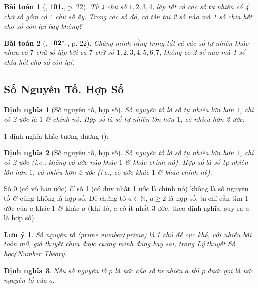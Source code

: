\documentclass{article}
\numberwithin{equation}{section}
\newtheorem{dinhnghia}{Định nghĩa}[section]
\newtheorem{baitoan}{Bài toán}[section]
\newtheorem{luuy}{Lưu ý}[section]
\begin{document}
\begin{baitoan}[\cite{Binh_Toan_6_tap_1}, \textbf{101.}, p. 22]
	Từ 4 chữ số $1,2,3,4$, lập tất cả các số tự nhiên có 4 chữ số gồm cả $4$ chữ số ấy. Trong các số đó, có tồn tại 2 số nào mà 1 số chia hết cho số còn lại hay không?
\end{baitoan}

\begin{baitoan}[\cite{Binh_Toan_6_tap_1}, $\bf 102^\star.$, p. 22]
	Chứng minh rằng trong tất cả các số tự nhiên khác nhau có $7$ chữ số lập bởi cả $7$ chữ số $1,2,3,4,5,6,7$, không có 2 số nào mà 1 số chia hết cho số còn lại.
\end{baitoan}


\subsection{Số Nguyên Tố. Hợp Số}

\begin{dinhnghia}[Số nguyên tố, hợp số]
	\emph{Số nguyên tố} là số tự nhiên lớn hơn $1$, chỉ có 2 ước là $1$ \textit{\&} chính nó. \emph{Hợp số} là số tự nhiên lớn hơn $1$, có nhiều hơn 2 ước.
\end{dinhnghia}
1 định nghĩa khác tương đương (\cite[\S5, p. 23]{Binh_Toan_6_tap_1}):

\begin{dinhnghia}[Số nguyên tố, hợp số]
	\emph{Số nguyên tố} là số tự nhiên lớn hơn $1$, chỉ có 2 ước (i.e., không có ước nào khác $1$ \& khác chính nó). \emph{Hợp số} là số tự nhiên lớn hơn $1$, có nhiều hơn 2 ước (i.e., có ước khác $1$ \& khác chính nó).
\end{dinhnghia}
Số 0 (có vô hạn ước) \textit{\&} số 1 (có duy nhất 1 ước là chính nó) không là số nguyên tố \textit{\&} cũng không là hợp số. Để chứng tỏ $a\in\mathbb{N}$, $a\ge 2$ là hợp số, ta chỉ cần tìm 1 ước của $a$ khác 1 \textit{\&} khác $a$ (khi đó, $a$ có ít nhất 3 ước, theo định nghĩa, suy ra $a$ là hợp số).

\begin{luuy}
	Số nguyên tố (prime number\emph{\texttt{/}}prime) là 1 chủ đề cực khó, với nhiều bài toán mở, giả thuyết chưa được chứng minh đúng hay sai, trong Lý thuyết Số học\emph{\texttt{/}}Number Theory.
\end{luuy}

\begin{dinhnghia}
	Nếu số nguyên tố $p$ là ước của số tự nhiên $a$ thì $p$ được gọi là \emph{ước nguyên tố} của $a$.
\end{dinhnghia}
\end{document}
